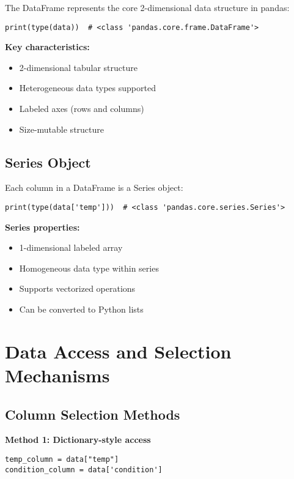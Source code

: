 \documentclass[12pt]{article}
\begin{document}
The DataFrame represents the core 2-dimensional data structure in pandas:

\begin{lstlisting}
print(type(data))  # <class 'pandas.core.frame.DataFrame'>
\end{lstlisting}

\textbf{Key characteristics:}
\begin{itemize}
    \item 2-dimensional tabular structure
    \item Heterogeneous data types supported
    \item Labeled axes (rows and columns)
    \item Size-mutable structure
\end{itemize}

\subsection{Series Object}

Each column in a DataFrame is a Series object:

\begin{lstlisting}
print(type(data['temp']))  # <class 'pandas.core.series.Series'>
\end{lstlisting}

\textbf{Series properties:}
\begin{itemize}
    \item 1-dimensional labeled array
    \item Homogeneous data type within series
    \item Supports vectorized operations
    \item Can be converted to Python lists
\end{itemize}

\section{Data Access and Selection Mechanisms}

\subsection{Column Selection Methods}

\textbf{Method 1: Dictionary-style access}
\begin{lstlisting}
temp_column = data["temp"]
condition_column = data['condition']
\end{lstlisting}
\end{document}
